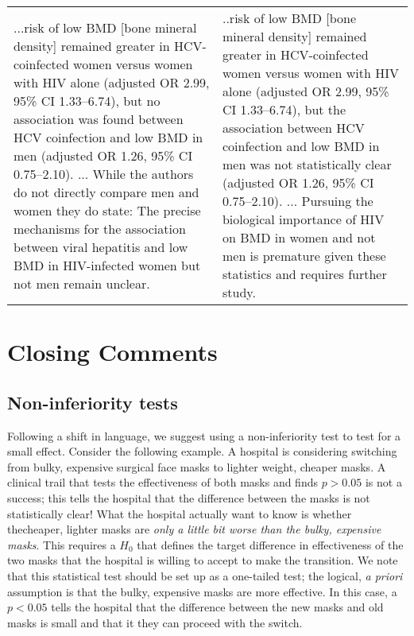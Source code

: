 \begin{tabular}{p{7.0cm}p{7.0cm}}
...risk of low BMD [bone mineral density] remained greater in HCV-coinfected women versus women with HIV alone
(adjusted OR 2.99, 95\% CI 1.33–6.74), but no association was found between HCV coinfection and low BMD in men 
(adjusted OR 1.26, 95\% CI 0.75–2.10). ... While the authors do not directly compare men and women they do state: 
The precise mechanisms for the association between viral hepatitis and low BMD in HIV-infected women but not men 
remain unclear.
& 
..risk of low BMD [bone mineral density] remained greater in HCV-coinfected women versus women with HIV alone
(adjusted OR 2.99, 95\% CI 1.33–6.74), but the association between HCV coinfection and low BMD in men was not
statistically clear (adjusted OR 1.26, 95\% CI 0.75–2.10). ... Pursuing the biological importance of HIV on BMD in 
women and not men is premature given these statistics and requires further study.
\\
\end{tabular}

\section*{Closing Comments}

\subsection*{Non-inferiority tests}

Following a shift in language, we suggest using a non-inferiority test to test for a small effect. Consider the following example. A hospital is considering switching from bulky, expensive surgical face masks to lighter weight, cheaper masks. A clinical trail that tests the effectiveness of both masks and finds $p > 0.05$ is not a success; this tells the hospital that the difference between the masks is not statistically clear! What the hospital actually want to know is whether thecheaper, lighter masks are \emph{only a little bit worse than the bulky, expensive masks}. This requires a $H_{0}$ that defines the target difference in effectiveness of the two masks that the hospital is willing to accept to make the transition. We note that this statistical test should be set up as a one-tailed test; the logical, \emph{a priori} assumption is that the bulky, expensive masks are more effective. In this case, a $p < 0.05$ tells the hospital that the difference between the new masks and old masks is small and that it they can proceed with the switch.

